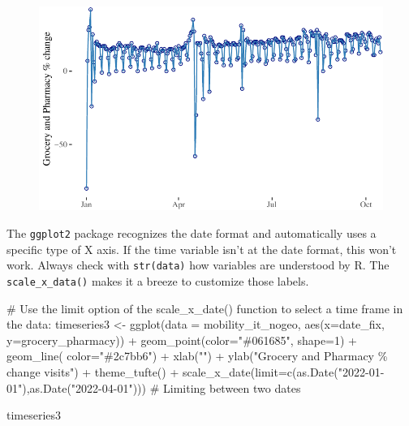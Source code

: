 \documentclass[
  letterpaper,
  DIV=11,
  numbers=noendperiod]{scrreprt}
\newenvironment{Shaded}{\begin{snugshade}}{\end{snugshade}}
\newcommand{\AttributeTok}[1]{\textcolor[rgb]{0.40,0.45,0.13}{#1}}
\newcommand{\CommentTok}[1]{\textcolor[rgb]{0.37,0.37,0.37}{#1}}
\newcommand{\DecValTok}[1]{\textcolor[rgb]{0.68,0.00,0.00}{#1}}
\newcommand{\FunctionTok}[1]{\textcolor[rgb]{0.28,0.35,0.67}{#1}}
\newcommand{\NormalTok}[1]{\textcolor[rgb]{0.00,0.23,0.31}{#1}}
\newcommand{\OtherTok}[1]{\textcolor[rgb]{0.00,0.23,0.31}{#1}}
\newcommand{\SpecialCharTok}[1]{\textcolor[rgb]{0.37,0.37,0.37}{#1}}
\newcommand{\StringTok}[1]{\textcolor[rgb]{0.13,0.47,0.30}{#1}}
\begin{document}
\begin{figure}[H]

{\centering \includegraphics{longitudinal-1_files/figure-pdf/unnamed-chunk-9-1.pdf}

}

\end{figure}

The \texttt{ggplot2} package recognizes the date format and
automatically uses a specific type of X axis. If the time variable isn't
at the date format, this won't work. Always check with
\texttt{str(data)} how variables are understood by R. The
\texttt{scale\_x\_data()} makes it a breeze to customize those labels.

\begin{Shaded}
\begin{Highlighting}[]
\CommentTok{\# Use the limit option of the scale\_x\_date() function to select a time frame in the data:}
\NormalTok{timeseries3 }\OtherTok{\textless{}{-}} \FunctionTok{ggplot}\NormalTok{(}\AttributeTok{data =}\NormalTok{ mobility\_it\_nogeo, }\FunctionTok{aes}\NormalTok{(}\AttributeTok{x=}\NormalTok{date\_fix, }\AttributeTok{y=}\NormalTok{grocery\_pharmacy)) }\SpecialCharTok{+}
  \FunctionTok{geom\_point}\NormalTok{(}\AttributeTok{color=}\StringTok{"\#061685"}\NormalTok{, }\AttributeTok{shape=}\DecValTok{1}\NormalTok{) }\SpecialCharTok{+}
  \FunctionTok{geom\_line}\NormalTok{( }\AttributeTok{color=}\StringTok{"\#2c7bb6"}\NormalTok{) }\SpecialCharTok{+}
  \FunctionTok{xlab}\NormalTok{(}\StringTok{""}\NormalTok{) }\SpecialCharTok{+}
  \FunctionTok{ylab}\NormalTok{(}\StringTok{"Grocery and Pharmacy \% change visits"}\NormalTok{) }\SpecialCharTok{+}
  \FunctionTok{theme\_tufte}\NormalTok{() }\SpecialCharTok{+}
  \FunctionTok{scale\_x\_date}\NormalTok{(}\AttributeTok{limit=}\FunctionTok{c}\NormalTok{(}\FunctionTok{as.Date}\NormalTok{(}\StringTok{"2022{-}01{-}01"}\NormalTok{),}\FunctionTok{as.Date}\NormalTok{(}\StringTok{"2022{-}04{-}01"}\NormalTok{))) }\CommentTok{\# Limiting between two dates }

\NormalTok{timeseries3}
\end{Highlighting}
\end{Shaded}
\end{document}
